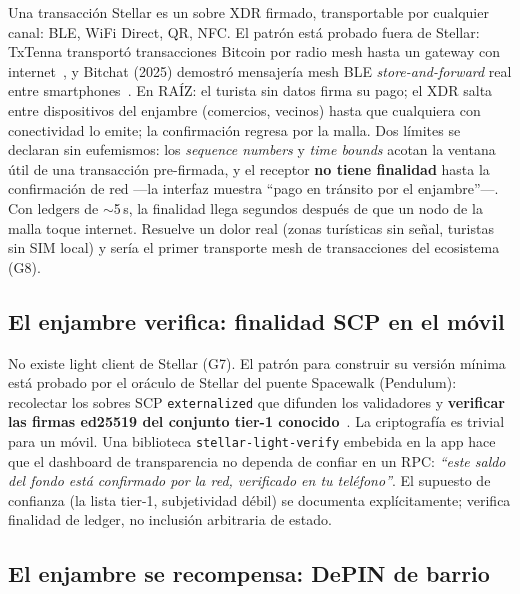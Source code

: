 \documentclass[twocolumn,10pt]{article}
\begin{document}
Una transacci\'on Stellar es un sobre XDR firmado, transportable por cualquier canal: BLE, WiFi Direct, QR, NFC. El patr\'on est\'a probado fuera de Stellar: TxTenna transport\'o transacciones Bitcoin por radio mesh hasta un gateway con internet~\cite{txtenna}, y Bitchat (2025) demostr\'o mensajer\'ia mesh BLE \emph{store-and-forward} real entre smartphones~\cite{bitchat}. En RA\'IZ: el turista sin datos firma su pago; el XDR salta entre dispositivos del enjambre (comercios, vecinos) hasta que cualquiera con conectividad lo emite; la confirmaci\'on regresa por la malla. Dos l\'imites se declaran sin eufemismos: los \emph{sequence numbers} y \emph{time bounds} acotan la ventana \'util de una transacci\'on pre-firmada, y el receptor \textbf{no tiene finalidad} hasta la confirmaci\'on de red ---la interfaz muestra ``pago en tr\'ansito por el enjambre''---. Con ledgers de $\sim$5\,s, la finalidad llega segundos despu\'es de que un nodo de la malla toque internet. Resuelve un dolor real (zonas tur\'isticas sin se\~nal, turistas sin SIM local) y ser\'ia el primer transporte mesh de transacciones del ecosistema (G8).

\subsection{El enjambre verifica: finalidad SCP en el m\'ovil}
\label{sec:lightverify}

No existe light client de Stellar (G7). El patr\'on para construir su versi\'on m\'inima est\'a probado por el or\'aculo de Stellar del puente Spacewalk (Pendulum): recolectar los sobres SCP \texttt{externalized} que difunden los validadores y \textbf{verificar las firmas ed25519 del conjunto tier-1 conocido}~\cite{spacewalk}. La criptograf\'ia es trivial para un m\'ovil. Una biblioteca \texttt{stellar-light-verify} embebida en la app hace que el dashboard de transparencia no dependa de confiar en un RPC: \emph{``este saldo del fondo est\'a confirmado por la red, verificado en tu tel\'efono''}. El supuesto de confianza (la lista tier-1, subjetividad d\'ebil) se documenta expl\'icitamente; verifica finalidad de ledger, no inclusi\'on arbitraria de estado.

\subsection{El enjambre se recompensa: DePIN de barrio}
\label{sec:depin}
\end{document}
